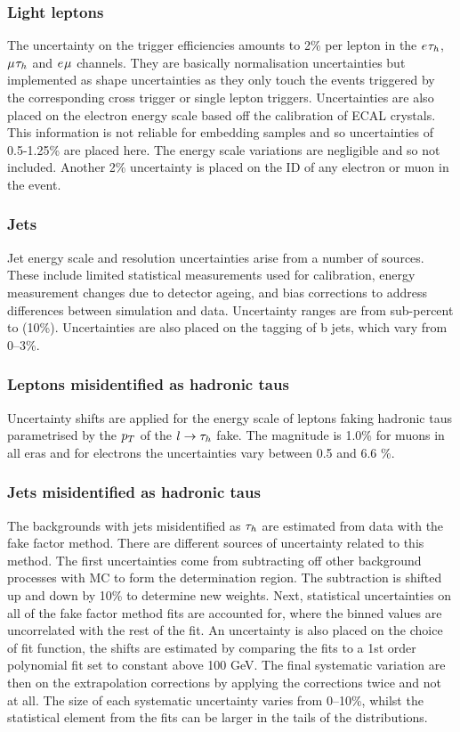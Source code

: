 \subsubsection{Light leptons}
The uncertainty on the trigger efficiencies amounts to 2\% per lepton in the $e_{}\tau_{h}$, $\mu_{}\tau_{h}$ and $e_{}\mu_{}$ channels.
They are basically normalisation uncertainties but implemented as shape uncertainties as they only touch the events triggered by the corresponding cross trigger or single lepton triggers.
Uncertainties are also placed on the electron energy scale based off the calibration of ECAL crystals.
This information is not reliable for embedding samples and so uncertainties of 0.5-1.25\% are placed here. 
The energy scale variations are negligible and so not included.
Another 2\% uncertainty is placed on the ID of any electron or muon in the event.

\subsubsection{Jets}
Jet energy scale and resolution uncertainties arise from a number of sources. 
These include limited statistical measurements used for calibration, energy measurement changes due to detector ageing, and bias corrections to address differences between simulation and data. 
Uncertainty ranges are from sub-percent to \order(10\%).
Uncertainties are also placed on the tagging of b jets, which vary from 0--3\%.

\subsubsection{Leptons misidentified as hadronic taus}
Uncertainty shifts are applied for the energy scale of leptons faking hadronic taus parametrised by the $p_{T}$ of the $l \rightarrow\tau_{h}$ fake.
The magnitude is 1.0\% for muons in all eras and for electrons the uncertainties vary between 0.5 and 6.6 \%.

\subsubsection{Jets misidentified as hadronic taus}
The backgrounds with jets misidentified as $\tau_{h}$ are estimated from data with the fake factor method. 
There are different sources of uncertainty related to this method.
The first uncertainties come from subtracting off other background processes with MC to form the determination region. 
The subtraction is shifted up and down by 10\% to determine new weights.
Next, statistical uncertainties on all of the fake factor method fits are accounted for, where the binned values are uncorrelated with the rest of the fit.
An uncertainty is also placed on the choice of fit function, the shifts are estimated by comparing the fits to a 1st order polynomial fit set to constant above 100 GeV.
The final systematic variation are then on the extrapolation corrections by applying the corrections twice and not at all.
The size of each systematic uncertainty varies from 0--10\%, whilst the statistical element from the fits can be larger in the tails of the distributions.

